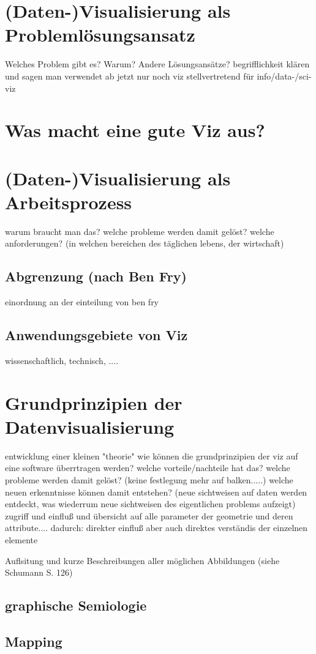 \documentclass[a4paper, 12pt, onepage, pdftex, headsepline, footsepline]{scrreprt}
\begin{document}
\section{(Daten-)Visualisierung als Problemlösungsansatz}
Welches Problem gibt es?
Warum?
Andere Lösungsansätze?
begrifflichkeit klären und sagen man verwendet ab jetzt nur noch viz stellvertretend für info/data-/sci-viz
\section{Was macht eine gute Viz aus?}
\section{(Daten-)Visualisierung als Arbeitsprozess}
warum braucht man das? welche probleme werden damit gelöst?
welche anforderungen? (in welchen bereichen des täglichen lebens, der wirtschaft)
\subsection{Abgrenzung (nach Ben Fry)}
einordnung an der einteilung von ben fry
\subsection{Anwendungsgebiete von Viz}
wissenschaftlich, technisch, ....
\section{Grundprinzipien der Datenvisualisierung}
entwicklung einer kleinen "theorie"
wie können die grundprinzipien der viz auf eine software überrtragen werden?
welche vorteile/nachteile hat das?
welche probleme werden damit gelöst? (keine festlegung mehr auf balken.....)
welche neuen erkenntnisse können damit entstehen? (neue sichtweisen auf daten werden entdeckt, was wiederrum neue sichtweisen des eigentlichen problems aufzeigt)
zugriff und einfluß und übersicht auf alle parameter der geometrie und deren attribute....
dadurch: direkter einfluß aber auch direktes verständis der einzelnen elemente

Auflsitung und kurze Beschreibungen aller möglichen Abbildungen (siehe Schumann S. 126)
\subsection{graphische Semiologie}
\subsection{Mapping}
\end{document}
